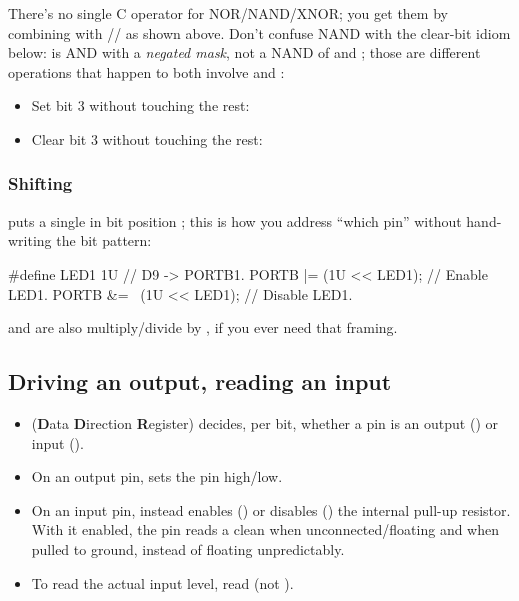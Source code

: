 \noindent There's no single C operator for NOR/NAND/XNOR; you get them by combining \code{~} with
\code{|}/\code{&}/\code{^} as shown above. Don't confuse NAND with the clear-bit idiom below:
 is AND with a \emph{negated mask}, not a NAND of  and ;
those are different operations that happen to both involve \code{~} and \code{&}:
\begin{itemize}
  \item Set bit 3 without touching the rest: 
  \item Clear bit 3 without touching the rest: 
\end{itemize}

\subsubsection{Shifting}
 puts a single  in bit position ; this is how you address ``which
pin'' without hand-writing the bit pattern:

\begin{ccode}
#define LED1 1U         // D9 -> PORTB1.
PORTB |= (1U << LED1);  // Enable LED1.
PORTB &= ~(1U << LED1); // Disable LED1.
\end{ccode}

\noindent{} and  are also multiply/divide by , if you ever need
that framing.

\subsection{Driving an output, reading an input}
\label{c2:a:4}
\begin{itemize}
  \item {} (\textbf{D}ata \textbf{D}irection \textbf{R}egister) decides, per bit, whether a
    pin is an output () or input ().
  \item On an output pin,  sets the pin high/low.
  \item On an input pin,  instead enables () or disables () the internal
    pull-up resistor. With it enabled, the pin reads a clean  when unconnected/floating and
     when pulled to ground, instead of floating unpredictably.
  \item To read the actual input level, read  (not ).
\end{itemize}

